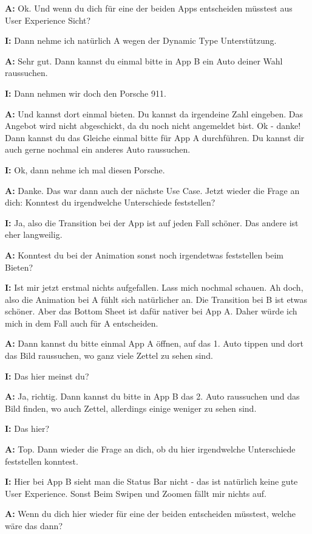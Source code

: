 \begin{myparindent}{0pt}
\textbf{A:} Ok. Und wenn du dich für eine der beiden Apps entscheiden müsstest aus User Experience Sicht?

\textbf{I:} Dann nehme ich natürlich A wegen der Dynamic Type Unterstützung. 

\textbf{A:} Sehr gut. Dann kannst du einmal bitte in App B ein Auto deiner Wahl raussuchen. 

\textbf{I:} Dann nehmen wir doch den Porsche 911.

\textbf{A:} Und kannst dort einmal bieten. Du kannst da irgendeine Zahl eingeben. Das Angebot wird nicht abgeschickt, da du noch nicht angemeldet bist. Ok - danke! 
Dann kannst du das Gleiche einmal bitte für App A durchführen. Du kannst dir auch gerne nochmal ein anderes Auto raussuchen. 

\textbf{I:} Ok, dann nehme ich mal diesen Porsche. 

\textbf{A:} Danke. Das war dann auch der nächste Use Case. Jetzt wieder die Frage an dich: Konntest du irgendwelche Unterschiede feststellen?

\textbf{I:} Ja, also die Transition bei der App ist auf jeden Fall schöner. Das andere ist eher langweilig.

\textbf{A:} Konntest du bei der Animation sonst noch irgendetwas feststellen beim Bieten?

\textbf{I:} Ist mir jetzt erstmal nichts aufgefallen. Lass mich nochmal schauen. Ah doch, also die Animation bei A fühlt sich natürlicher an. Die Transition bei B ist etwas schöner. Aber das Bottom Sheet ist dafür nativer bei App A. Daher würde ich mich in dem Fall auch für A entscheiden. 

\textbf{A:} Dann kannst du bitte einmal App A öffnen, auf das 1. Auto tippen und dort das Bild raussuchen, wo ganz viele Zettel zu sehen sind. 

\textbf{I:} Das hier meinst du?

\textbf{A:} Ja, richtig. Dann kannst du bitte in App B das 2. Auto raussuchen und das Bild finden, wo auch Zettel, allerdings einige weniger zu sehen sind. 

\textbf{I:} Das hier?

\textbf{A:} Top. Dann wieder die Frage an dich, ob du hier irgendwelche Unterschiede feststellen konntest. 

\textbf{I:} Hier bei App B sieht man die Status Bar nicht - das ist natürlich keine gute User Experience. Sonst Beim Swipen und Zoomen fällt mir nichts auf. 

\textbf{A:} Wenn du dich hier wieder für eine der beiden entscheiden müsstest, welche wäre das dann?


\end{myparindent}
